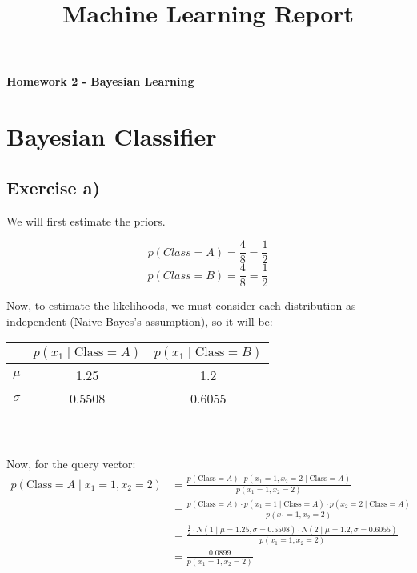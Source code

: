 \documentclass{article}
\title{Machine Learning Report}
\author{}
\date{}
\begin{document}
\maketitle
\begin{center}
    \textbf{Homework 2 - Bayesian Learning}
\end{center}

\section{Bayesian Classifier}
\subsection{Exercise a)}
We will first estimate the priors.

$$p(Class = A) = \frac{4}{8} = \frac{1}{2}$$
$$p(Class = B) = \frac{4}{8} = \frac{1}{2}$$

Now, to estimate the likelihoods, we must consider each distribution as independent (Naive Bayes's assumption), so it will be:
\\
\begin{tabular}{|c|c|c|}
    \hline
    & \( p(x_1 \mid \text{Class} = A) \) & \( p(x_1 \mid \text{Class} = B) \) \\ 
    \hline
    \( \mu \) & 1.25 & 1.2 \\
    \hline
    \( \sigma \) & 0.5508 & 0.6055 \\
    \hline
\end{tabular}
\\
\\
Now, for the query vector:
\begin{align*}
    p(\text{Class} = A \mid x_1 = 1, x_2 = 2) 
    &= \frac{p(\text{Class} = A) \cdot p(x_1 = 1, x_2 = 2 \mid \text{Class} = A)}{p(x_1 = 1, x_2 = 2)} \\
    &= \frac{p(\text{Class} = A) \cdot p(x_1 = 1 \mid \text{Class} = A) \cdot p(x_2 = 2 \mid \text{Class} = A)}{p(x_1 = 1, x_2 = 2)} \\
    &= \frac{\frac{1}{2} \cdot N(1 \mid \mu = 1.25, \sigma = 0.5508) \cdot N(2 \mid \mu = 1.2, \sigma = 0.6055)}{p(x_1 = 1, x_2 = 2)} \\
    &= \frac{0.0899}{p(x_1 = 1, x_2 = 2)}
\end{align*}
\end{document}
